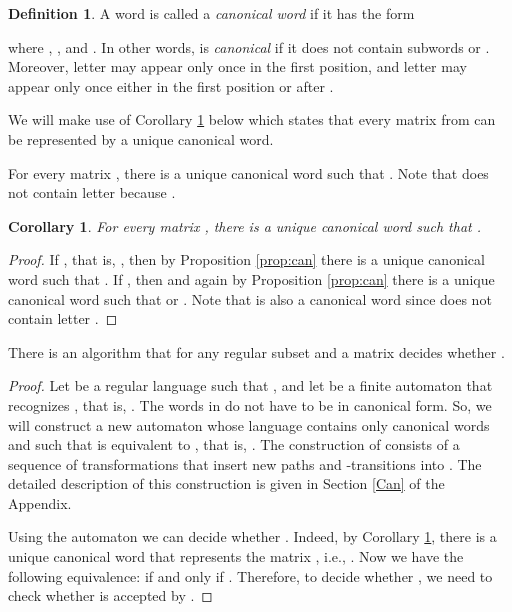 \documentclass[fontsize=11pt,DIV=13,paper=letter]{scrartcl}
\newtheorem{corollary}[theorem]{Corollary}
\theoremstyle{definition}
\newtheorem{definition}[theorem]{Definition}
\begin{document}
\begin{definition}
A word  is called a \emph{canonical word} if it has the form

where , , and . In other words,  is \emph{canonical} if it does not contain subwords  or . Moreover, letter  may appear only once in the first position, and letter  may appear only once either in the first position or after .
\end{definition}

We will make use of Corollary \ref{cor:can} below which states that every matrix from  can be represented by a unique canonical word.

\begin{proposition}\label{prop:can}
For every matrix , there is a unique canonical word  such that . Note that  does not contain letter  because .
\end{proposition}

\begin{corollary}\label{cor:can}
For every matrix , there is a unique canonical word  such that .
\end{corollary}

\begin{proof}
If , that is, , then by Proposition \ref{prop:can} there is a unique canonical word  such that . If , then  and again by Proposition \ref{prop:can} there is a unique canonical word  such that  or . Note that  is also a canonical word since  does not contain letter .
\end{proof}

\begin{proposition}\label{MPReg}
There is an algorithm that for any regular subset  and a matrix  decides whether .
\end{proposition}

\begin{proof}
Let  be a regular language such that , and let  be a finite automaton that recognizes , that is, . The words in  do not have to be in canonical form. So, we will construct a new automaton  whose language contains only canonical words and such that  is equivalent to , that is, . The construction of  consists of a sequence of transformations that insert new paths and -transitions into . The detailed description of this construction is given in Section \ref{Can} of the Appendix.

Using the automaton  we can decide whether . Indeed, by Corollary \ref{cor:can}, there is a unique canonical word  that represents the matrix , i.e., . Now we have the following equivalence:  if and only if . Therefore, to decide whether , we need to check whether  is accepted by .

\end{proof}
\end{document}

